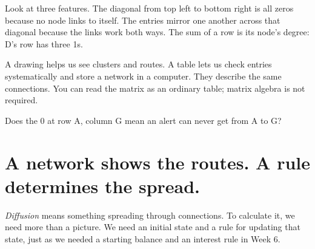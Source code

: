\documentclass[11pt,letterpaper]{article}
\begin{document}
\par{}\par\medskip


Look at three features. The diagonal from top left to bottom right is all zeros because no node links to itself. The entries mirror one another across that diagonal because the links work both ways. The sum of a row is its node's degree: D's row has three 1s.



\begin{tcolorbox}[title={Why learn a second representation?},breakable,colback=warm,colbacktitle=warm,coltitle=gold,colframe=gold!35]

A drawing helps us see clusters and routes. A table lets us check entries systematically and store a network in a computer. They describe the same connections. You can read the matrix as an ordinary table; matrix algebra is not required.


\end{tcolorbox}


\begin{tcolorbox}[title={Pause and try 7},breakable]
Does the 0 at row A, column G mean an alert can never get from A to G?
\end{tcolorbox}


\clearpage

\section{A network shows the routes. A rule determines the spread.}


\emph{Diffusion} means something spreading through connections. To calculate it, we need more than a picture. We need an initial state and a rule for updating that state, just as we needed a starting balance and an interest rule in Week 6.
\end{document}

